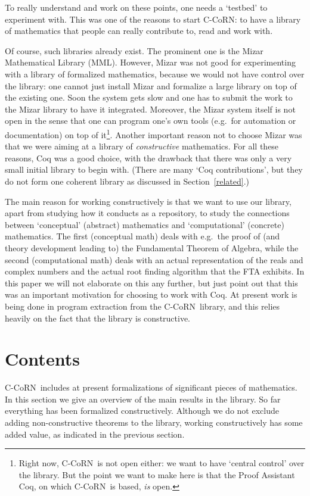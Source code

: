 \documentclass[runningheads]{llncs}
\newcommand{\ccorn}{\mbox{C-CoRN}}
\newcommand{\fta}{FTA}
\begin{document}
To really understand and work on these points, one needs a
`testbed' to experiment with. This was one of the reasons to start
{\ccorn}: to have a library of mathematics that people can really
contribute to, read and work with.

Of course, such libraries already exist. The prominent one is the
Mizar Mathematical Library (MML).  However, Mizar was not good for 
experimenting with a library of formalized mathematics,
because we would not have control over the library: one cannot just
install Mizar and formalize a large library on top of the existing
one. Soon the system gets slow and one has to submit the work to the
Mizar library to have it integrated. Moreover, the Mizar system itself
is not open in the sense that one can program one's own tools (e.g.\
for automation or documentation) on top of it\footnote{Right now,
\ccorn\ is not open either: we want to have `central control' over
the library. But the point we want to make here is that the Proof
Assistant Coq, on which \ccorn\ is based, {\em is\/} open.}.
Another important reason not to choose Mizar was that we were aiming
at a library of {\em constructive\/} mathematics. For all these
reasons, Coq was a good choice, with the drawback that there was only
a very small initial library to begin with. (There are many `Coq
contributions', but they do not form one coherent library as discussed
in Section~\ref{related}.)

The main reason for working constructively is that we want to use our
library, apart from studying how it conducts as a repository, to study
the connections between `conceptual' (abstract) mathematics and
`computational' (concrete) mathematics. The first (conceptual math)
deals with e.g.\ the proof of (and theory development leading to) the
Fundamental Theorem of Algebra, while the second (computational math)
deals with an actual representation of the reals and complex numbers
and the actual root finding algorithm that the {\fta} exhibits. In
this paper we will not elaborate on this any further, but just point
out that this was an important motivation for choosing to work with
Coq. At present work is being done in program extraction from the
\ccorn\ library, and this relies heavily on the fact that the library
is constructive.

\section{Contents\label{contents}}

\ccorn\ includes at present formalizations of significant pieces of
mathematics.  In this section we give an overview of the main
results in the library.
So far everything
has been formalized constructively.  Although we do not exclude adding
non-constructive theorems to the library, working constructively has
some added value, as indicated 
in the previous section.
\end{document}
